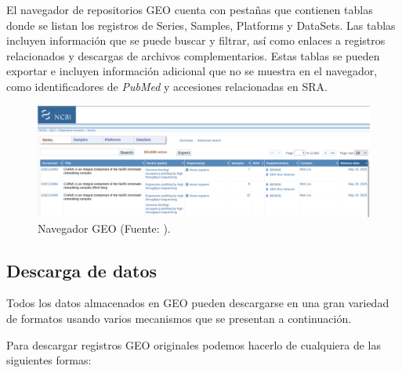 El navegador de repositorios GEO cuenta con pestañas que contienen tablas donde se listan los registros de Series, Samples, Platforms y DataSets. Las tablas incluyen información que se 
puede buscar y filtrar, así como enlaces a registros relacionados y descargas de archivos complementarios. Estas tablas se pueden exportar e incluyen información adicional que no se muestra
en el navegador, como identificadores de \textit{PubMed} y accesiones relacionadas en SRA.

\begin{figure}[h]
    \centering
    \includegraphics[width=1\textwidth]{../img/geo-browser.png}
    \caption{Navegador GEO (Fuente: \cite{geo-browse}).}
\end{figure}

\subsection{Descarga de datos}

Todos los datos almacenados en GEO pueden descargarse en una gran variedad de formatos usando varios mecanismos que se presentan a continuación.

Para descargar registros GEO originales podemos hacerlo de cualquiera de las siguientes formas:

